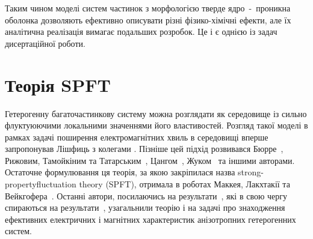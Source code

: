 \documentclass[14pt,twoside]{vakthesis}
\begin{document}
Таким чином моделі систем частинок з морфологією тверде ядро~-~проникна оболонка дозволяють ефективно описувати різні фізико-хімічні ефекти, але їх аналітична реалізація вимагає подальших розробок. Це і є однією із задач дисертаційної роботи.


\section{Теорія SPFT}\label{sec:SPFT}

Гетерогенну багаточастинкову систему можна розглядати як середовище із сильно флуктуюючими локальними значеннями його властивостей. Розгляд такої моделі в рамках задачі поширення електромагнітних хвиль в середовищі вперше запропонував Лішфиць з колегами \cite{Lifshitz1950}. Пізніше цей підхід розвивався Бюрре~\cite{Bourret1962}, Рижовим, Тамойкіним та Татарським~\cite{Ryzhov1965,
RyzhovRev}, Цангом~\cite{Tsang1981}, Жуком~\cite{Zhuk1994} та іншими авторами.
Остаточне формулювання ця теорія, за якою закріпилася назва  strong-propertyfluctuation
theory (SPFT), отримала в роботах Маккея, Лакхтакії та Вейкгофера~\cite{Michel1995,Mackay2000, Mackay2001}.
Останні автори, посилаючись на результати~\cite{Tsang1981}, які в свою чергу спираються на результати~\cite{Ryzhov1965, RyzhovRev}, узагальнили  теорію і на задачі про знаходження ефективних електричних і магнітних характеристик анізотропних гетерогенних систем.
\end{document}
